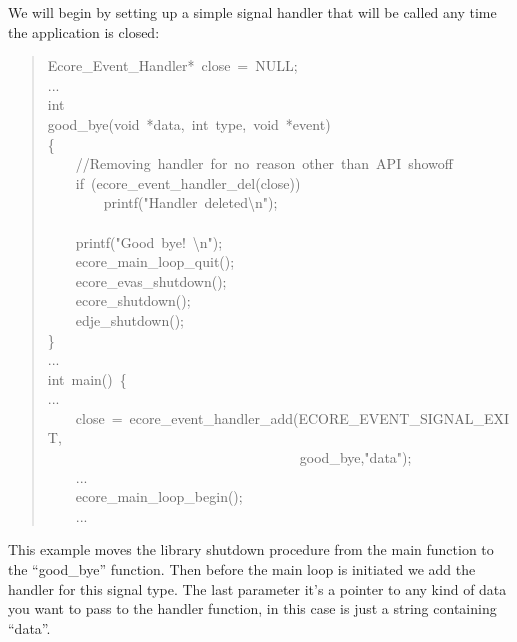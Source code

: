 \documentclass[12pt,a4paper,english]{book}
\begin{document}
We will begin by setting up a simple signal handler that will be called any
time the application is closed:
\begin{quote}{\ttfamily \raggedright \noindent
Ecore{\_}Event{\_}Handler*~close~=~NULL;~\\
...~\\
int~\\
good{\_}bye(void~*data,~int~type,~void~*event)~\\
{\{}~\\
~~~~//Removing~handler~for~no~reason~other~than~API~showoff~\\
~~~~if~(ecore{\_}event{\_}handler{\_}del(close))~\\
~~~~~~~~printf("Handler~deleted{\textbackslash}n");~\\
~\\
~~~~printf("Good~bye!~{\textbackslash}n");~\\
~~~~ecore{\_}main{\_}loop{\_}quit();~\\
~~~~ecore{\_}evas{\_}shutdown();~\\
~~~~ecore{\_}shutdown();~\\
~~~~edje{\_}shutdown();~\\
{\}}~\\
...~\\
int~main()~{\{}~\\
...~\\
~~~~close~=~ecore{\_}event{\_}handler{\_}add(ECORE{\_}EVENT{\_}SIGNAL{\_}EXIT,~\\
~~~~~~~~~~~~~~~~~~~~~~~~~~~~~~~~~~~~good{\_}bye,"data");~\\
~~~~...~\\
~~~~ecore{\_}main{\_}loop{\_}begin();~\\
~~~~...
}\end{quote}

This example moves the library shutdown procedure from the main function to the
``good{\_}bye'' function. Then before the main loop is initiated we add the handler
for this signal type. The last parameter it's a pointer to any kind of data you
want to pass to the handler function, in this case is just a string containing
``data''.
\end{document}
